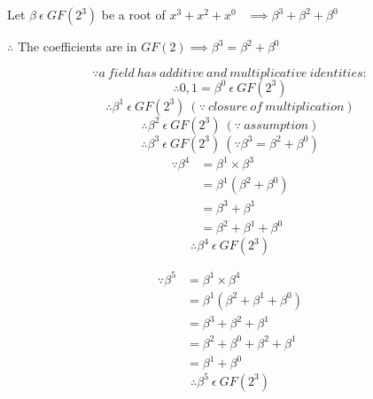 \documentclass[11pt]{extarticle}
\newcommand{\examplepoly}{$x^{3}+x^{2}+x^{0}$}
\begin{document}
                \hspace*{\fill}
                \centerline{Let $\beta \ \epsilon \ GF(2^{3})$ be a root of
                \examplepoly~ $\implies \beta^{3}+\beta^{2}+\beta^{0}$}
                \hspace*{\fill}
                \centerline{$\therefore$ The coefficients are in $GF(2)
                \implies
                \beta^{3}=\beta^{2}+\beta^{0}$}
                \[ \because a \ field \ has \ additive \ and \ multiplicative \
                identities: \]
                \[ \therefore 0, 1=\beta^{0} \ \epsilon \ GF(2^{3}) \]
                \[ \therefore \beta^{1} \ \epsilon \ GF(2^{3}) \ (\because \
                closure \ of \ multiplication) \]
                \[ \therefore \beta^{2} \ \epsilon \ GF(2^{3}) \ (\because \
                assumption) \]
                \[ \therefore \beta^{3} \ \epsilon \ GF(2^{3}) \ (\because
                \beta^{3}=\beta^{2}+\beta^{0}) \]
                \begin{equation*}
                    \begin{split}
                        \because \beta^{4} & = \beta^{1} \times \beta^{3} \\ &
                        =
                        \beta^{1} (\beta^{2}+\beta^{0}) \\ & =
                        \beta^{3}+\beta^{1}
                        \\ & = \beta^{2}+\beta^{1}+\beta^{0}
                    \end{split}
                \end{equation*}
                \[ \therefore \beta^{4} \ \epsilon \ GF(2^{3}) \]

                \begin{equation*}
                    \begin{split}
                        \because \beta^{5} & = \beta^{1} \times \beta^{4} \\ &
                        =
                        \beta^{1} (\beta^{2}+\beta^{1}+\beta^{0}) \\ & =
                        \beta^{3}+\beta^{2}+\beta^{1} \\ & =
                        \beta^{2}+\beta^{0}+\beta^{2}+\beta^{1} \\ & =
                        \beta^{1}+\beta^{0}
                    \end{split}
                \end{equation*}
                \[ \therefore \beta^{5} \ \epsilon \ GF(2^{3}) \]
\end{document}
